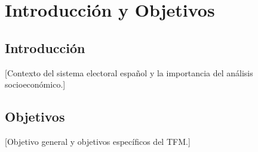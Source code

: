 \chapter{Introducción y Objetivos}

\section{Introducción}
[Contexto del sistema electoral español y la importancia del análisis socioeconómico.]

\section{Objetivos}
[Objetivo general y objetivos específicos del TFM.]
